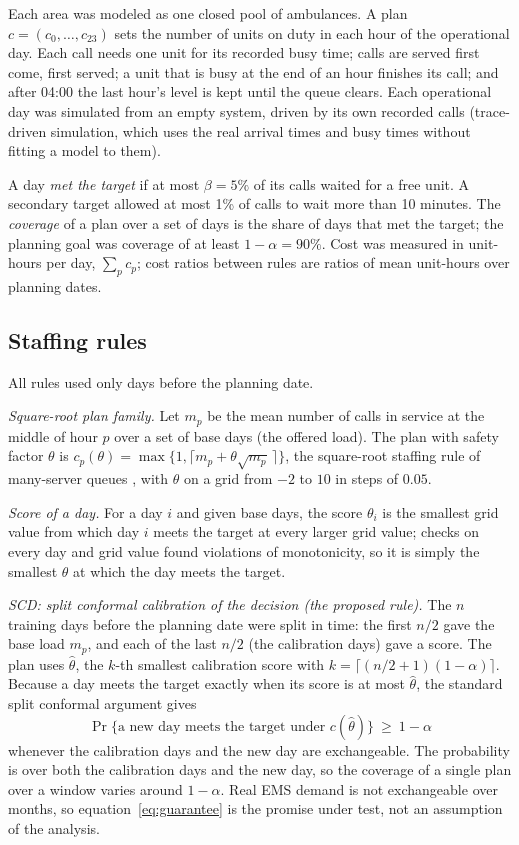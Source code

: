 \documentclass[12pt]{article}
\begin{document}
Each area was modeled as one closed pool of ambulances. A plan $c=(c_0,\dots,c_{23})$ sets the number of units on duty in each hour of the operational day. Each call needs one unit for its recorded busy time; calls are served first come, first served; a unit that is busy at the end of an hour finishes its call; and after 04:00 the last hour's level is kept until the queue clears. Each operational day was simulated from an empty system, driven by its own recorded calls (trace-driven simulation, which uses the real arrival times and busy times without fitting a model to them).

A day \emph{met the target} if at most $\beta=5\%$ of its calls waited for a free unit. A secondary target allowed at most 1\% of calls to wait more than 10 minutes. The \emph{coverage} of a plan over a set of days is the share of days that met the target; the planning goal was coverage of at least $1-\alpha=90\%$. Cost was measured in unit-hours per day, $\sum_p c_p$; cost ratios between rules are ratios of mean unit-hours over planning dates.

\subsection{Staffing rules}

All rules used only days before the planning date.

\emph{Square-root plan family.} Let $m_p$ be the mean number of calls in service at the middle of hour $p$ over a set of base days (the offered load). The plan with safety factor $\theta$ is $c_p(\theta)=\max\{1,\lceil m_p+\theta\sqrt{m_p}\,\rceil\}$, the square-root staffing rule of many-server queues \citep{halfin1981heavy,gans2003telephone}, with $\theta$ on a grid from $-2$ to $10$ in steps of $0.05$.

\emph{Score of a day.} For a day $i$ and given base days, the score $\theta_i$ is the smallest grid value from which day $i$ meets the target at every larger grid value; checks on every day and grid value found  violations of monotonicity, so it is simply the smallest $\theta$ at which the day meets the target.

\emph{SCD: split conformal calibration of the decision (the proposed rule).} The $n$ training days before the planning date were split in time: the first $n/2$ gave the base load $m_p$, and each of the last $n/2$ (the calibration days) gave a score. The plan uses $\hat\theta$, the $k$-th smallest calibration score with $k=\lceil(n/2+1)(1-\alpha)\rceil$. Because a day meets the target exactly when its score is at most $\hat\theta$, the standard split conformal argument \citep{vovk2022algorithmic,lei2018distribution} gives
\begin{equation}
\Pr\{\text{a new day meets the target under } c(\hat\theta)\}\ \ge\ 1-\alpha
\label{eq:guarantee}
\end{equation}
whenever the calibration days and the new day are exchangeable. The probability is over both the calibration days and the new day, so the coverage of a single plan over a window varies around $1-\alpha$. Real EMS demand is not exchangeable over months, so equation~\eqref{eq:guarantee} is the promise under test, not an assumption of the analysis.
\end{document}
